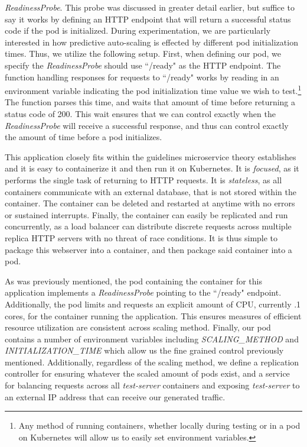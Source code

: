 \begin{itemize}
    \textit{ReadinessProbe}. This probe was discussed in greater detail earlier,
    but suffice to say it works by defining an HTTP endpoint that will return a
    successful status code if the pod is initialized. During experimentation, we
    are particularly interested in how predictive auto-scaling is effected by
    different pod initialization times. Thus, we utilize the following setup.
    First, when defining our pod, we specify the \textit{ReadinessProbe} should
    use ``/ready" as the HTTP endpoint. The function handling responses for
    requests to ``/ready" works by reading in an environment variable indicating
    the pod initialization time value we wish to test.\footnote{Any method of
    running containers, whether locally during testing or in a pod on Kubernetes
    will allow us to easily set environment variables.} The function parses this
    time, and waits that amount of time before returning a status code of 200.
    This wait ensures that we can control exactly when the
    \textit{ReadinessProbe} will receive a successful response, and thus can
    control exactly the amount of time before a pod initializes.
\end{itemize}

This application closely fits within the guidelines microservice theory
establishes and it is easy to containerize it and then run it on Kubernetes. It
is \textit{focused}, as it performs the single task of returning to HTTP
requests. It is \textit{stateless}, as all containers communicate with an
external database, that is not stored within the container. The container can be
deleted and restarted at anytime with no errors or sustained interrupts.
Finally, the container can easily be replicated and run concurrently, as
a load balancer can distribute discrete requests across multiple replica HTTP
servers with no threat of race conditions. It is thus simple to package this
webserver into a container, and then package said container into a pod.

As was previously mentioned, the pod containing the container for this
application implements a \textit{ReadinessProbe} pointing to the ``/ready"
endpoint. Additionally, the pod limits and requests an explicit amount of CPU,
currently .1 cores, for the container running the application. This ensures
measures of efficient resource utilization are consistent across scaling method.
Finally, our pod contains a number of environment variables including
\textit{SCALING\_METHOD} and \textit{INITIALIZATION\_TIME} which allow us the
fine grained control previously mentioned. Additionally,
regardless of the scaling method, we define a replication controller for
ensuring whatever the scaled amount of pods exist, and a service for balancing
requests across all \textit{test-server} containers and exposing
\textit{test-server} to an external IP address that can receive our generated
traffic.
